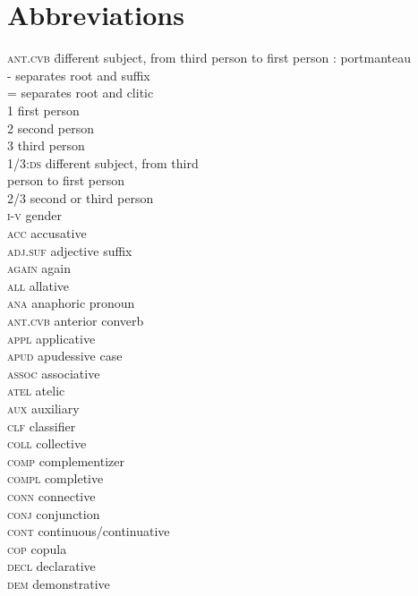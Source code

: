 \documentclass[output=paper]{LSP/langsci}
\begin{document}
\section*{Abbreviations}
\begin{multicols}{2}
\begin{tabbing}
\textsc{ant.cvb}  \= different subject, from third person to first person\kill
\textsc{:} \> portmanteau \\
\textsc{-} \> separates root and suffix \\
\textsc{=} \> separates root and clitic \\
\textsc{1} \> first person \\
\textsc{2} \> second person \\
\textsc{3}  \> third person \\
\textsc{1/3:ds}  \> different subject, from third \\ \> person to first person\\
\textsc{2/3}  \> second or third person \\
\textsc{i-v} \> gender \\
\textsc{acc} \> accusative \\
\textsc{adj.suf} \> adjective suffix \\
\textsc{again} \> again \\
\textsc{all} \> allative \\
\textsc{ana} \> anaphoric pronoun \\
\textsc{ant.cvb} \> anterior converb \\
\textsc{appl} \> applicative \\
\textsc{apud} \> apudessive case \\
\textsc{assoc} \> associative \\
\textsc{atel} \> atelic \\
\textsc{aux} \> auxiliary \\
\textsc{clf} \> classifier \\
\textsc{coll} \> collective \\
\textsc{comp} \> complementizer \\
\textsc{compl} \> completive \\
\textsc{conn} \> connective \\
\textsc{conj} \> conjunction \\
\textsc{cont} \> continuous/continuative \\
\textsc{cop}  \> copula \\
\textsc{decl} \> declarative \\
\textsc{dem} \> demonstrative \\

\end{tabbing}
\end{multicols}
\end{document}
